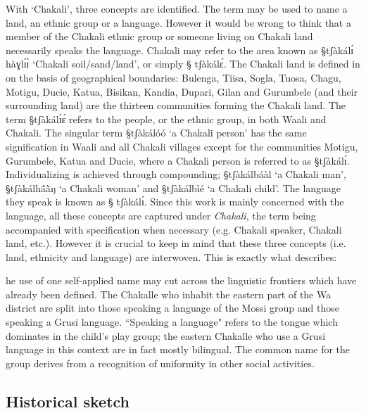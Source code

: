 With `Chakali',    three concepts are identified. The term may be used  to name
a
land,  an ethnic group or a language.  However it would be wrong to think that a
member of the Chakali ethnic group  or  
someone living on Chakali land necessarily speaks the language.  Chakali may refer to the
area known as {\S tʃàkálɪ́ hàɣlɪ́ɪ̀} `Chakali soil/sand/land', or simply  {\S
tʃàkálɛ́}. The Chakali land is
defined in \cite{Daan94} on the basis of geographical boundaries: Bulenga,
Tiisa, Sogla, Tuosa, Chagu, Motigu, Ducie, Katua, Bisikan, Kandia, Dupari,
Gilan and Gurumbele (and their surrounding land) are the  thirteen communities
forming the Chakali land. The term {\S tʃàkálɪ́ɛ́} refers to the people, or the
ethnic group, in both Waali and Chakali. The singular term {\S tʃàkálóó} `a
Chakali person'  has the same signification in Waali and all Chakali villages
except for the communities  Motigu, Gurumbele, Katua and Ducie, where a
Chakali
person is referred to as {\S tʃàkálɪ́}.  Individualizing is achieved through
compounding; {\S tʃàkálbáàl}  `a Chakali man', {\S tʃàkálhã́ã̀ŋ} `a
Chakali woman'
and {\S tʃàkálbìé} `a Chakali child'. The language they speak is known as {\S
tʃàkálɪ́}. Since this work is mainly concerned with the language,  all these
concepts are captured under  \textit{Chakali},
 the term being accompanied with specification when necessary (e.g. Chakali
speaker,
Chakali land, etc.). However it is crucial to keep in mind that 
these three  concepts (i.e. land, ethnicity and language) are 
interwoven.  This is exactly
what \citeauthor{Good54} describes: 

\begin{Lquote} [t]he use of one self-applied name may cut across the linguistic
frontiers which have already been defined. The Chakalle who inhabit the eastern
part of the Wa district are split into those speaking a language of the Mossi
group and those speaking a Grusi language. ``Speaking a language" refers to the
tongue which dominates in the child's play group; the eastern Chakalle who use a
Grusi language in this context are in fact mostly bilingual. The common name for
the group derives from a recognition of uniformity in other social activities.
\end{Lquote} 


\subsection{Historical sketch}
\label{sec:SOC-hist-bk}


